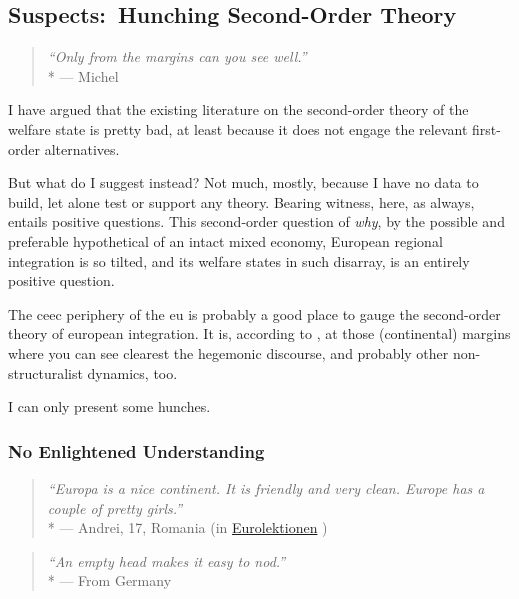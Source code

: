 \subsection[Suspects]{Suspects:\ Hunching Second-Order Theory}

\begin{quote}
	\emph{``Only from the margins can you see well.''}
	\\*
	--- Michel \cite{Foucault-1972-aa}
\end{quote}

I have argued that the existing literature on the second-order theory of the welfare state is pretty bad, at least because it does not engage the relevant first-order alternatives.

But what do I suggest instead?
Not much, mostly, because I have no data to build, let alone test or support any theory.
Bearing witness, here, as always, entails positive questions.
This second-order question of \emph{why}, by the possible and preferable hypothetical of an intact mixed economy, European regional integration is so tilted, and its welfare states in such disarray, is an entirely positive question.

The \gls{ceec} periphery of the \gls{eu} is probably a good place to gauge the second-order theory of european integration.
It is, according to \cite{Foucault-1972-aa}, at those (continental) margins where you can see clearest the hegemonic discourse, and probably other non-structuralist dynamics, too.

I can only present some hunches.

\subsubsection[No Enlightened Understanding]{No Enlightened Understanding}

\begin{quote}
	\emph{``Europa is a nice continent.
	It is friendly and very clean.
	Europe has a couple of pretty girls.''}
	\\*
	--- Andrei, 17, Romania (in \href{http://eurolektionen.de}{Eurolektionen} \citeyear{DeRuffray2010})
\end{quote}

\begin{quote}
	\emph{``An empty head makes it easy to nod.''}
	\\*
	--- From Germany
\end{quote}

